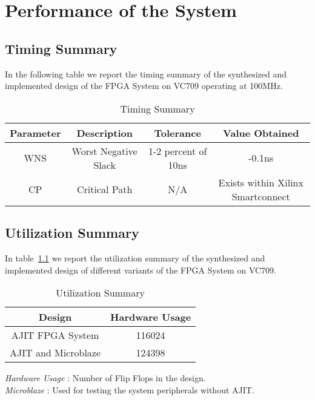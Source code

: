 \chapter{Performance of the System}


\section*{Timing Summary}

In the following table we report the timing summary of the synthesized and implemented design of the FPGA System on VC709 operating at
100MHz.

\begin{table}[H]
\centering
\begin{tabular}{c | c | c | c}
\hline
Parameter & Description & Tolerance & Value Obtained \\
\hline
WNS & Worst Negative Slack & 1-2 percent of 10ns & -0.1ns\\
CP & Critical Path & N/A & Exists within Xilinx Smartconnect  
\end{tabular}
\caption{Timing Summary}
\end{table}

\section*{Utilization Summary}
In table~\ref{ajit_utilization} we report the utilization summary of the synthesized and implemented design of different variants of the FPGA System
on VC709.

\begin{table}[H]
\centering
\begin{tabular}{c | c}
\hline
Design & Hardware Usage \\
\hline
AJIT FPGA System & 116024 \\
AJIT and Microblaze & 124398\\
\hline
\end{tabular}
\caption{Utilization Summary}
\label{ajit_utilization}
\end{table}

\begin{flushleft}
\textit{Hardware Usage} : Number of Flip Flops in the design.\\
\textit{Microblaze} : Used for testing the system peripherals without AJIT.
\end{flushleft}

